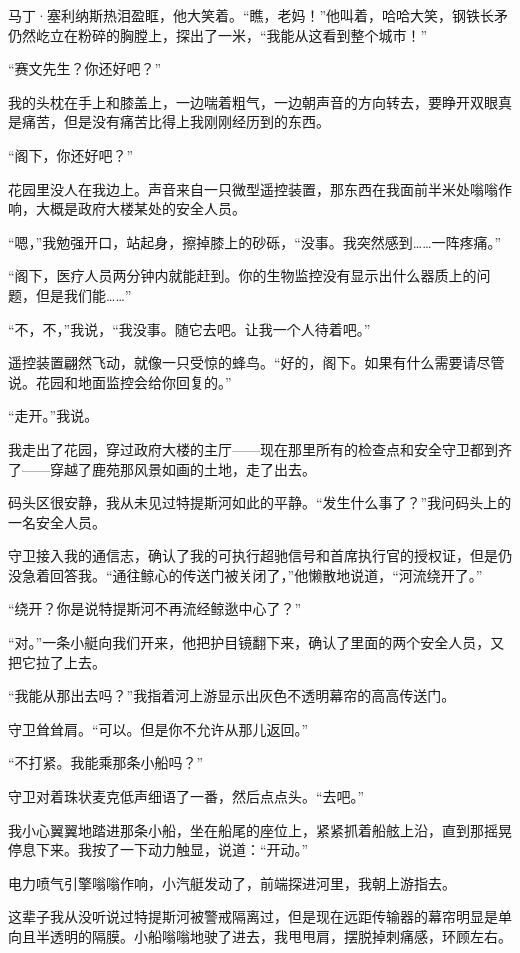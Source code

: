 \documentclass[AutoFakeBold=true]{book}
\begin{document}
马丁·塞利纳斯热泪盈眶，他大笑着。``瞧，老妈！''他叫着，哈哈大笑，钢铁长矛仍然屹立在粉碎的胸膛上，探出了一米，``我能从这看到整个城市！''

\vspace*{1em}

``赛文先生？你还好吧？''

我的头枕在手上和膝盖上，一边喘着粗气，一边朝声音的方向转去，要睁开双眼真是痛苦，但是没有痛苦比得上我刚刚经历到的东西。

``阁下，你还好吧？''

花园里没人在我边上。声音来自一只微型遥控装置，那东西在我面前半米处嗡嗡作响，大概是政府大楼某处的安全人员。

``嗯，''我勉强开口，站起身，擦掉膝上的砂砾，``没事。我突然感到……一阵疼痛。''

``阁下，医疗人员两分钟内就能赶到。你的生物监控没有显示出什么器质上的问题，但是我们能……''

``不，不，''我说，``我没事。随它去吧。让我一个人待着吧。''

遥控装置翩然飞动，就像一只受惊的蜂鸟。``好的，阁下。如果有什么需要请尽管说。花园和地面监控会给你回复的。''

``走开。''我说。

我走出了花园，穿过政府大楼的主厅——现在那里所有的检查点和安全守卫都到齐了——穿越了鹿苑那风景如画的土地，走了出去。

码头区很安静，我从未见过特提斯河如此的平静。``发生什么事了？''我问码头上的一名安全人员。

守卫接入我的通信志，确认了我的可执行超驰信号和首席执行官的授权证，但是仍没急着回答我。``通往鲸心的传送门被关闭了，''他懒散地说道，``河流绕开了。''

``绕开？你是说特提斯河不再流经鲸逖中心了？''

``对。''一条小艇向我们开来，他把护目镜翻下来，确认了里面的两个安全人员，又把它拉了上去。

``我能从那出去吗？''我指着河上游显示出灰色不透明幕帘的高高传送门。

守卫耸耸肩。``可以。但是你不允许从那儿返回。''

``不打紧。我能乘那条小船吗？''

守卫对着珠状麦克低声细语了一番，然后点点头。``去吧。''

我小心翼翼地踏进那条小船，坐在船尾的座位上，紧紧抓着船舷上沿，直到那摇晃停息下来。我按了一下动力触显，说道：``开动。''

电力喷气引擎嗡嗡作响，小汽艇发动了，前端探进河里，我朝上游指去。

这辈子我从没听说过特提斯河被警戒隔离过，但是现在远距传输器的幕帘明显是单向且半透明的隔膜。小船嗡嗡地驶了进去，我甩甩肩，摆脱掉刺痛感，环顾左右。
\end{document}
